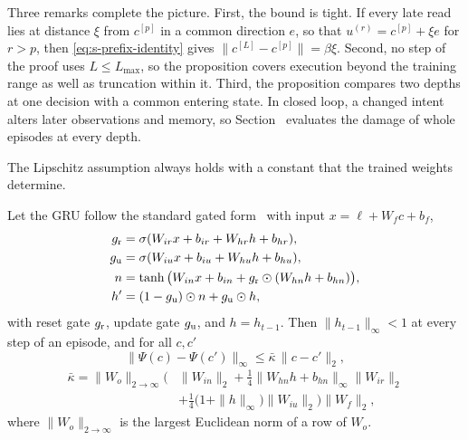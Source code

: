 Three remarks complete the picture. First, the bound  is tight. If every late read lies at distance $\xi$ from $c^{[p]}$ in a common direction $e$, so that $u^{(r)}=c^{[p]}+\xi e$ for $r>p$, then \eqref{eq:s-prefix-identity} gives $\|c^{[L]}-c^{[p]}\|=\beta\xi$. Second, no step of the proof uses $L\le L_{\max}$, so the proposition covers execution beyond the training range as well as truncation within it. Third, the proposition compares two depths at one decision with a common entering state. In closed loop, a changed intent alters later observations and memory, so Section~ evaluates the damage of whole episodes at every depth.

The Lipschitz assumption always holds with a constant that the trained weights determine.

\begin{lemma}
\label{lem:s-lipschitz}
Let the GRU follow the standard gated form~\cite{cho2014gru} with input $x=\ell+W_fc+b_f$,
\begin{align*}
g_{\rm r}&=\sigma(W_{ir}x+b_{ir}+W_{hr}h+b_{hr}),\\
g_{\rm u}&=\sigma(W_{iu}x+b_{iu}+W_{hu}h+b_{hu}),\\
n&=\tanh\big(W_{in}x+b_{in}+g_{\rm r}\odot(W_{hn}h+b_{hn})\big),\\
h'&=(1-g_{\rm u})\odot n+g_{\rm u}\odot h,
\end{align*}
with reset gate $g_{\rm r}$, update gate $g_{\rm u}$, and $h=h_{t-1}$. Then $\|h_{t-1}\|_\infty<1$ at every step of an episode, and for all $c,c'$
\begin{equation}
\|\Psi(c)-\Psi(c')\|_\infty\le\bar\kappa\,\|c-c'\|_2,
\label{eq:s-kappa}
\end{equation}
\begin{align*}
\bar\kappa=\|W_o\|_{2\to\infty}\Big(&\|W_{in}\|_2+\tfrac14\|W_{hn}h+b_{hn}\|_\infty\|W_{ir}\|_2\\
&+\tfrac14\big(1+\|h\|_\infty\big)\|W_{iu}\|_2\Big)\|W_f\|_2,
\end{align*}
where $\|W_o\|_{2\to\infty}$ is the largest Euclidean norm of a row of $W_o$.
\end{lemma}

